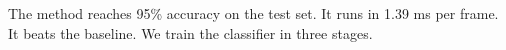 The method reaches 95\% accuracy on the test set. It runs in 1.39 ms per frame.
It beats the baseline. We train the classifier in three stages.
